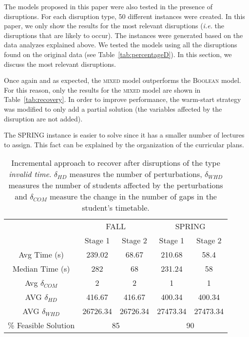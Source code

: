\documentclass[twocolumn,natbib]{svjour3}          %
\begin{document}
The models proposed in this paper were also tested in the presence of disruptions. For each disruption type, 50 different instances were created. In this paper, we only show the results for the most relevant disruptions (\emph{i.e.} the disruptions that are likely to occur). The instances were generated based on the data analyzes explained above. We tested the models using all the disruptions found on the original data (see Table~\ref{tab:percentageD}). In this section, we discuss the most relevant disruptions.

Once again and as expected, the \textsc{mixed} model outperforms the \textsc{Boolean} model. For this reason, only the results for the \textsc{mixed} model are shown in Table~\ref{tab:recovery}. In order to improve performance, the warm-start strategy was modified to only add a partial solution (the variables affected by the disruption are not added).

The \textsc{\textsc{SPRING}} instance is easier to solve since it has a smaller number of lectures to assign. This fact can be explained by the organization of the curricular plans. 

\begin{table*}[!t]
	\centering
	\caption{Incremental approach to recover after disruptions of the type \textit{invalid time}. $\delta_{HD}$ measures the number of perturbations, $\delta_{WHD}$ measures the number of students affected by the perturbations and $\delta_{COM}$ measure the change in the number of gaps in the student’s timetable.}
	\label{tab:ite}
	\begin{tabular}{l|c|c|c|c|}
		\cline{2-5}
		& \multicolumn{2}{c|}{\textsc{FALL}} & \multicolumn{2}{c|}{\textsc{SPRING}} \\ \cline{2-5} 
		& Stage 1     & Stage 2     & Stage 1      & Stage 2      \\ \hline
		\multicolumn{1}{|c|}{Avg Time (s)}                & 239.02 & 68.67 & 210.68      & 58.4         \\ \hline
		\multicolumn{1}{|c|}{Median Time (s)}                 & 282         & 68          & 231.24       & 58           \\ \hline
		\multicolumn{1}{|c|}{Avg $\delta_{COM}$ }                     & 2           & 2           & 1            & 1            \\ \hline
		\multicolumn{1}{|c|}{AVG $\delta_{HD}$}                     & 416.67 & 416.67 & 400.34  & 400.34  \\ \hline
		\multicolumn{1}{|c|}{AVG $\delta_{WHD}$}                     & 26726.34 & 26726.34 & 27473.34  & 27473.34  \\ \hline
		\multicolumn{1}{|c|}{\% Feasible Solution} & \multicolumn{2}{c|}{85}   & \multicolumn{2}{c|}{90}     \\ \hline
	\end{tabular}
\end{table*}
\end{document}
